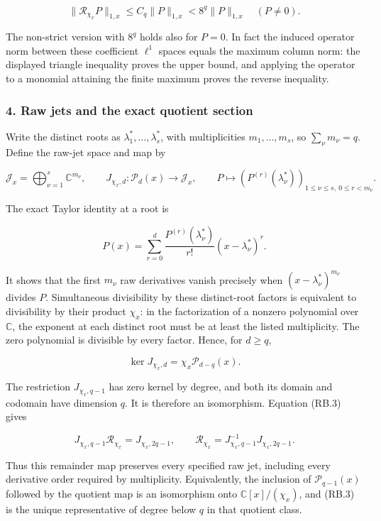 \[
\boxed{\|\mathcal R_{\chi_x}P\|_{1,x}
\leq C_q\|P\|_{1,x}<8^q\|P\|_{1,x}\quad(P\neq0).}
\tag{RB.19}
\]

The non-strict version with \(8^q\) holds also for \(P=0\). In fact the induced operator norm between these coefficient \(\ell^1\) spaces equals the maximum column norm: the displayed triangle inequality proves the upper bound, and applying the operator to a monomial attaining the finite maximum proves the reverse inequality.

\subsubsection{4. Raw jets and the exact quotient section}\label{endpoint-relation_balance_original--raw-jets-and-the-exact-quotient-section}

Write the distinct roots as \(\lambda_1^*,\ldots,\lambda_s^*\), with multiplicities \(m_1,\ldots,m_s\), so \(\sum_\nu m_\nu=q\). Define the raw-jet space and map by

\[
\mathcal J_x=\bigoplus_{\nu=1}^{s}\mathbb C^{m_\nu},\qquad
J_{\chi_x,d}:\mathcal P_d(x)\longrightarrow\mathcal J_x,
\qquad P\longmapsto
\left(P^{(r)}(\lambda_\nu^*)\right)_{
 1\leq\nu\leq s,\ 0\leq r<m_\nu}.
\tag{RB.20}
\]

The exact Taylor identity at a root is

\[
P(x)=\sum_{r=0}^{d}\frac{P^{(r)}(\lambda_\nu^*)}{r!}
(x-\lambda_\nu^*)^r.
\]

It shows that the first \(m_\nu\) raw derivatives vanish precisely when \((x-\lambda_\nu^*)^{m_\nu}\) divides \(P\). Simultaneous divisibility by these distinct-root factors is equivalent to divisibility by their product \(\chi_x\): in the factorization of a nonzero polynomial over \(\mathbb C\), the exponent at each distinct root must be at least the listed multiplicity. The zero polynomial is divisible by every factor. Hence, for \(d\geq q\),

\[
\ker J_{\chi_x,d}=\chi_x\mathcal P_{d-q}(x).
\tag{RB.21}
\]

The restriction \(J_{\chi_x,q-1}\) has zero kernel by degree, and both its domain and codomain have dimension \(q\). It is therefore an isomorphism. Equation (RB.3) gives

\[
\boxed{
J_{\chi_x,q-1}\mathcal R_{\chi_x}=J_{\chi_x,2q-1},
\qquad
\mathcal R_{\chi_x}=J_{\chi_x,q-1}^{-1}J_{\chi_x,2q-1}.}
\tag{RB.22}
\]

Thus this remainder map preserves every specified raw jet, including every derivative order required by multiplicity. Equivalently, the inclusion of \(\mathcal P_{q-1}(x)\) followed by the quotient map is an isomorphism onto \(\mathbb C[x]/(\chi_x)\), and (RB.3) is the unique representative of degree below \(q\) in that quotient class.

